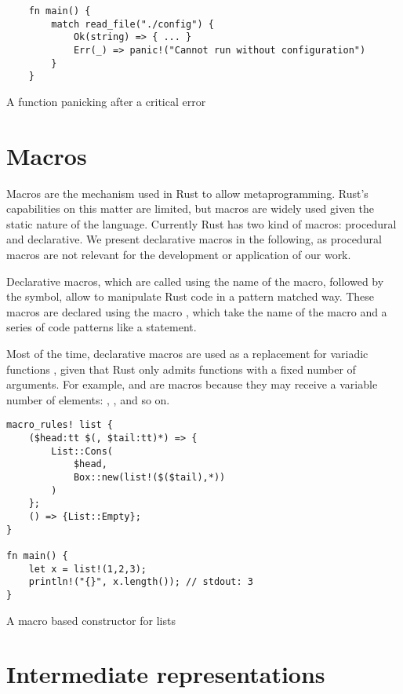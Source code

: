 \begin{listing}[h]
	\begin{verbatim}
    fn main() {
        match read_file("./config") {
            Ok(string) => { ... }
            Err(_) => panic!("Cannot run without configuration")
        }
    }
    \end{verbatim}
  \caption{A function panicking after a critical error}
  \label{lst:unrecoverable_error}
\end{listing}

\section{Macros}

Macros are the mechanism used in Rust to allow metaprogramming. Rust's
capabilities on this matter are limited, but macros are widely used given the
static nature of the language. Currently Rust has two kind of macros:
procedural and declarative. We present declarative macros in the following, as
procedural macros are not relevant for the development or application of our
work.

Declarative macros, which are called using the name of the macro, followed by the
\inrust{!} symbol, allow to manipulate Rust code in a pattern matched way. These
macros are declared using the macro , which take the name
of the macro and a series of code patterns like a  statement. 

Most of the time, declarative macros are used as a replacement for variadic functions
, given that Rust only admits functions with a fixed
number of arguments. For example,  and  are macros
because they may receive a variable number of elements: ,
,   and so on.


\begin{listing}[h]
	\begin{verbatim}
macro_rules! list {
    ($head:tt $(, $tail:tt)*) => {
        List::Cons(
            $head, 
            Box::new(list!($($tail),*))
        )
    };
    () => {List::Empty};
}

fn main() {
    let x = list!(1,2,3);
    println!("{}", x.length()); // stdout: 3
}
    \end{verbatim}
  \caption{A macro based constructor for lists}
  \label{lst:declarative_macro}
\end{listing}

\section{Intermediate representations}

